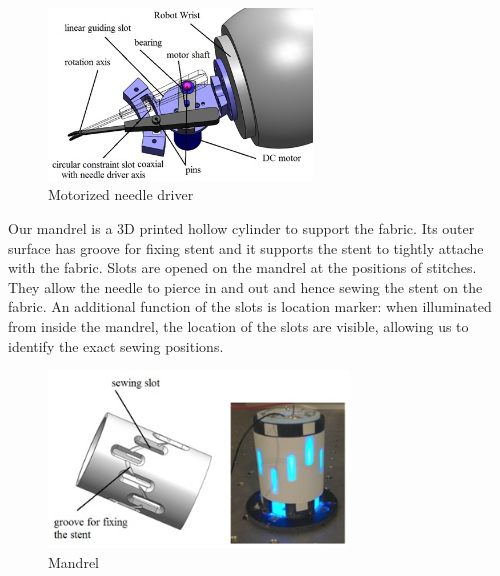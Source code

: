 

\begin{figure}
\centering
{
\includegraphics[width=7cm]{./fig/needledriver.jpg}
\caption{{Motorized needle driver}}
\label{fig:needledriver}}

\end{figure}

Our mandrel is a 3D printed hollow cylinder to support the fabric. Its outer surface has groove for fixing stent and it supports the stent to tightly attache with the fabric. Slots are opened on the mandrel at the positions of stitches. They allow the needle to pierce in and out and hence sewing the stent on the fabric. An additional function of the slots is location marker: when illuminated from inside the mandrel, the location of the slots are visible, allowing us to identify the exact sewing positions.

\begin{figure}
\centering
{\includegraphics[width=8cm]{./fig/mandrel.jpg}
\caption{Mandrel}
\label{fig:mandrel}}
\end{figure}


